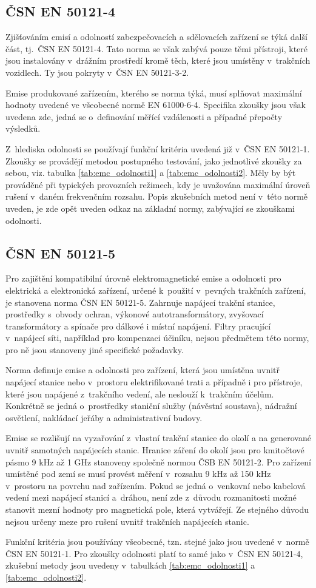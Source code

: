 \subsection{ČSN EN 50121-4}
Zjišťováním emisí a odolností zabezpečovacích a sdělovacích zařízení se týká další část, tj.~ČSN EN 50121-4. Tato norma se však zabývá pouze těmi přístroji, které jsou instalovány v~drážním prostředí kromě těch, které jsou umístěny v~trakčních vozidlech. Ty jsou pokryty v~ČSN EN 50121-3-2. 

Emise produkované zařízením, kterého se norma týká, musí splňovat maximální hodnoty uvedené ve všeobecné normě EN 61000-6-4. Specifika zkoušky jsou však uvedena zde, jedná se o~definování měřící vzdálenosti a případné přepočty výsledků.

Z~hlediska odolnosti se používají funkční kritéria uvedená již v~ČSN EN 50121-1. Zkoušky se provádějí metodou postupného testování, jako jednotlivé zkoušky za sebou, viz. tabulka \ref{tab:emc_odolnosti1} a \ref{tab:emc_odolnosti2}.
 Měly by být prováděné při typických provozních režimech, kdy je uvažována maximální úroveň rušení v~daném frekvenčním rozsahu. Popis zkušebních metod není v~této normě uveden, je zde opět uveden odkaz na základní normy, zabývající se zkouškami odolnosti. 

\subsection{ČSN EN 50121-5}
Pro zajištění kompatibilní úrovně elektromagnetické emise a odolnosti pro elektrická a elektronická zařízení, určené k~použití v~pevných trakčních zařízení, je stanovena norma ČSN EN 50121-5. Zahrnuje  napájecí trakční stanice, prostředky s~obvody ochran, výkonové autotransformátory, zvyšovací transformátory a spínače pro dálkové i místní napájení. Filtry pracující v~napájecí síti, například pro kompenzaci účiníku, nejsou předmětem této normy,  pro ně jsou stanoveny jiné specifické požadavky. 

Norma definuje emise a odolnosti pro zařízení, která jsou umístěna uvnitř napájecí stanice nebo v~prostoru elektrifikované trati a případně i pro přístroje, které jsou napájené z~trakčního vedení, ale neslouží k~trakčním účelům. Konkrétně se jedná o~prostředky staniční služby (návěstní soustava), nádražní osvětlení, nakládací jeřáby a administrativní budovy.  

Emise se rozlišují na vyzařování z~vlastní trakční stanice do okolí a na generované uvnitř samotných napájecích stanic. Hranice záření do okolí jsou pro kmitočtové pásmo 9 kHz až 1 GHz stanoveny společně normou ČSB EN 50121-2. Pro zařízení umístěné pod zemí se musí provést měření v~rozsahu 9 kHz až 150 kHz v~prostoru na povrchu nad zařízením. Pokud se jedná o~venkovní nebo kabelová vedení mezi napájecí stanicí a~dráhou, není zde z~důvodu rozmanitosti možné stanovit mezní hodnoty pro magnetická pole, která vytvářejí. Ze stejného důvodu nejsou určeny meze pro rušení uvnitř trakčních napájecích stanic. 

Funkční kritéria jsou používány všeobecné, tzn. stejné jako jsou uvedené v~normě ČSN EN 50121-1. Pro zkoušky odolnosti platí to samé jako v~ČSN EN 50121-4, zkušební metody jsou uvedeny v~tabulkách \ref{tab:emc_odolnosti1} a \ref{tab:emc_odolnosti2}.
